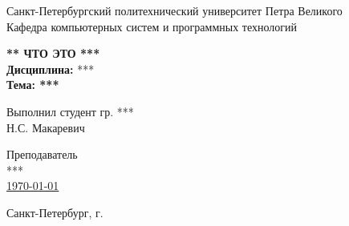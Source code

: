 
\begin{titlepage}
	\begin{center}
		\large
		Санкт-Петербургский политехнический университет Петра Великого\\
		Кафедра компьютерных систем и программных технологий
		
		\vfill
		
		\textsc{\bf \LARGE *** ЧТО ЭТО ***}\\[5mm]
		
		{ \Large
			{\bf Дисциплина:} *** \\[2mm]
			{\bf Тема: ***}
		}
		\bigskip
	\end{center}
	
	\vfill
	
	\newlength{\ML}
	\settowidth{\ML}{<<\underline{\hspace{0.7cm}}>> \underline{\hspace{2cm}}}
	\hfill
	\begin{minipage}{0.4\textwidth}
		Выполнил студент гр. ***\\
		\underline{\hspace{\ML}} Н.С. Макаревич\\
	\end{minipage}
	\bigskip
	
	\hfill
	\begin{minipage}{0.4\textwidth}
		Преподаватель \\
		\underline{\hspace{\ML}} ***\\[5mm]
		\underline{\today}
	\end{minipage}
	\vfill

	\begin{center}
		Санкт-Петербург, \the\year г.
	\end{center}
\end{titlepage}
